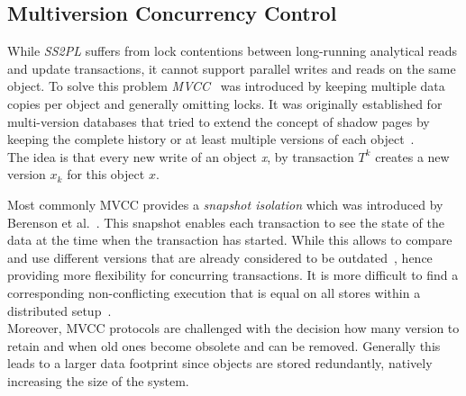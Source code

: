 \subsection{Multiversion Concurrency Control}
While \emph{SS2PL} suffers from lock contentions between long-running analytical reads and update transactions, it cannot support parallel writes and reads on the same object. 
To solve this problem \emph{MVCC}~\cite{bernstein:1981} was introduced by keeping multiple data copies per object and generally omitting locks.
It was originally established for multi-version databases that tried to extend the concept of shadow pages by keeping the complete history or at least multiple versions 
of each object~\cite{bernstein:1982, bernstein:1983}.\\
The idea is that every new write of an object \emph{x}, by transaction $T^k$ creates a new version $x_k$ for this object $x$.

Most commonly MVCC provides a \emph{snapshot isolation} which was introduced by Berenson et al.~\cite{berenson:1995}.
This snapshot enables each transaction to see the state of the data at the time when the transaction has started.
While this allows to compare and use different versions that are already considered to be outdated~\cite{faleiro:2015}, 
hence providing more flexibility for concurring transactions. It is more difficult to find a corresponding non-conflicting 
execution that is equal on all stores within a distributed setup~\cite{fekete:2005, daudjee:2006}.\\

Moreover, MVCC protocols are challenged with the decision how many version to retain and when old ones become obsolete and can be removed. 
Generally this leads to a larger data footprint since objects are stored redundantly, natively increasing the size of the system. 
